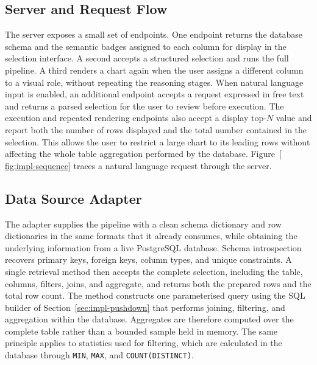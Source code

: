 \subsection{Server and Request Flow}

The server exposes a small set of endpoints. One endpoint returns the database schema and the semantic badges assigned to each column for display in the selection interface. A second accepts a structured selection and runs the full pipeline. A third renders a chart again when the user assigns a different column to a visual role, without repeating the reasoning stages. When natural language input is enabled, an additional endpoint accepts a request expressed in free text and returns a parsed selection for the user to review before execution. The execution and repeated rendering endpoints also accept a display top-$N$ value and report both the number of rows displayed and the total number contained in the selection. This allows the user to restrict a large chart to its leading rows without affecting the whole table aggregation performed by the database. Figure~\ref{ fig:impl-sequence} traces a natural language request through the server.


\subsection{Data Source Adapter}

The adapter supplies the pipeline with a clean schema dictionary and row dictionaries in the same formats that it already consumes, while obtaining the underlying information from a live PostgreSQL database. Schema introspection recovers primary keys, foreign keys, column types, and unique constraints. A single retrieval method then accepts the complete selection, including the table, columns, filters, joins, and aggregate, and returns both the prepared rows and the total row count. The method constructs one parameterised query using the SQL builder of Section~\ref{sec:impl-pushdown} that performs joining, filtering, and aggregation within the database. Aggregates are therefore computed over the complete table rather than a bounded sample held in memory. The same principle applies to statistics used for filtering, which are calculated in the database through \texttt{MIN}, \texttt{MAX}, and \texttt{COUNT(DISTINCT)}.

